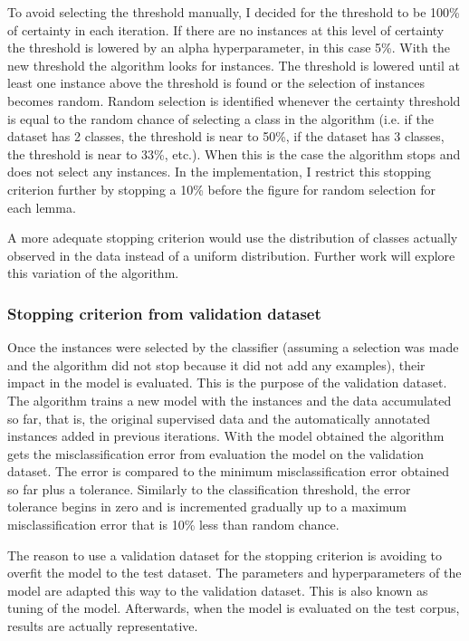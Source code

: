 To avoid selecting the threshold manually, I decided for the threshold to be
100\% of certainty in each iteration. If there are no instances at this level
of certainty the threshold is lowered by an alpha hyperparameter, in this case
5\%. With the new threshold the algorithm looks for instances. The threshold is
lowered until at least one instance above the threshold is found or the
selection of instances becomes random. Random selection is identified whenever
the certainty threshold is equal to the random chance of selecting a class in
the algorithm (i.e. if the dataset has 2 classes, the threshold is near to
50\%, if the dataset has 3 classes, the threshold is near to 33\%, etc.). When
this is the case the algorithm stops and does not select any instances. In the
implementation, I restrict this stopping criterion further by stopping a 10\%
before the figure for random selection for each lemma.

A more adequate stopping criterion would use the distribution of classes
actually observed in the data instead of a uniform distribution. Further work
will explore this variation of the algorithm.

\subsubsection{Stopping criterion from validation dataset}

Once the instances were selected by the classifier (assuming a selection was
made and the algorithm did not stop because it did not add any examples), their
impact in the model is evaluated. This is the purpose of the validation
dataset. The algorithm trains a new model with the instances and the data
accumulated so far, that is, the original supervised data and the automatically
annotated instances added in previous iterations. With the model obtained the
algorithm gets the misclassification error from evaluation the model on the
validation dataset. The error is compared to the minimum misclassification
error obtained so far plus a tolerance. Similarly to the classification
threshold, the error tolerance begins in zero and is incremented gradually up
to a maximum misclassification error that is 10\% less than random chance.

The reason to use a validation dataset for the stopping criterion is avoiding
to overfit the model to the test dataset. The parameters and hyperparameters of
the model are adapted this way to the validation dataset. This is also known as
tuning of the model. Afterwards, when the model is evaluated on the test
corpus, results are actually representative.

